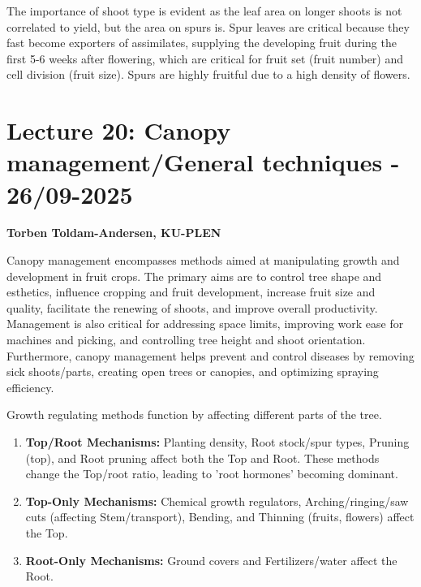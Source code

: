\vspace{0.5em}
The importance of shoot type is evident as the leaf area on longer shoots is not correlated to yield, but the area on spurs is. Spur leaves are critical because they fast become exporters of assimilates, supplying the developing fruit during the first 5-6 weeks after flowering, which are critical for fruit set (fruit number) and cell division (fruit size). Spurs are highly fruitful due to a high density of flowers.


\section{Lecture 20: Canopy management/General techniques - 26/09-2025}
\textbf{Torben Toldam-Andersen, KU-PLEN}

\vspace{1em}
Canopy management encompasses methods aimed at manipulating growth and development in fruit crops. The primary aims are to control tree shape and esthetics, influence cropping and fruit development, increase fruit size and quality, facilitate the renewing of shoots, and improve overall productivity. Management is also critical for addressing space limits, improving work ease for machines and picking, and controlling tree height and shoot orientation. Furthermore, canopy management helps prevent and control diseases by removing sick shoots/parts, creating open trees or canopies, and optimizing spraying efficiency.

\vspace{0.5em}
Growth regulating methods function by affecting different parts of the tree. 

\begin{enumerate} 
    \item \textbf{Top/Root Mechanisms:} Planting density, Root stock/spur types, Pruning (top), and Root pruning affect both the Top and Root. These methods change the Top/root ratio, leading to 'root hormones' becoming dominant. 
    \item \textbf{Top-Only Mechanisms:} Chemical growth regulators, Arching/ringing/saw cuts (affecting Stem/transport), Bending, and Thinning (fruits, flowers) affect the Top. 
    \item \textbf{Root-Only Mechanisms:} Ground covers and Fertilizers/water affect the Root. 
\end{enumerate} 

